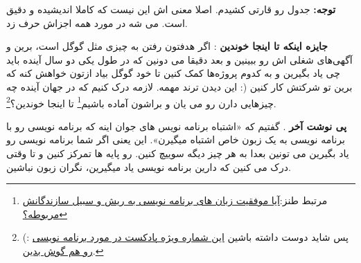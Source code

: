 \textbf{توجه:}
جدول رو قارتی کشیدم. اصلا معنی اش این نیست که کاملا اندیشیده و دقیق است. می شه در مورد همه اجزاش حرف زد.

\textbf{جایزه اینکه تا اینجا خوندین}
: اگر هدفتون رفتن به چیزی مثل گوگل است، برین و آگهی‌های شغلی اش رو ببینین و بعد دقیقا می دونین که در طول یکی دو سال آینده باید چی یاد بگیرین و به کدوم پروژه‌ها کمک کنین تا خود گوگل بیاد ازتون خواهش کنه که برین تو شرکتش کار کنین (: این دیدن ترند مهمه. لازمه درک کنیم که در جهان آینده چه چیزهایی دارن رو می یان و براشون آماده باشیم\footnote{مرتبط طنز:\href{http://jadi.net/2008/05/\%D8\%A2\%DB\%8C\%D8\%A7-\%D9\%85\%D9\%88\%D9\%81\%D9\%82\%DB\%8C\%D8\%AA-\%D8\%B2\%D8\%A8\%D8\%A7\%D9\%86\%E2\%80\%8C\%D9\%87\%D8\%A7\%DB\%8C-\%D8\%A8\%D8\%B1\%D9\%86\%D8\%A7\%D9\%85\%D9\%87\%E2\%80\%8C\%D9\%86\%D9\%88\%DB\%8C\%D8\%B3\%DB\%8C-\%D8\%A8\%D8\%A7/}{آیا موفقیت زبان های برنامه نویسی به ریش و سبیل سازندگانش مربوطه؟}}
تا اینجا خوندین؟\footnote{ (: پس شاید دوست داشته باشین
\href{http://jadi.net/2008/09/chegoone-barname-nevis-besham/" title="پادکست اول: چگونه می‌توانیم یک برنامه‌نویس خوب بشویم؟}{این شماره ویژه پادکست در مورد برنامه نویسی رو هم گوش بدین}.}.

\textbf{پی نوشت آخر}
. گفتیم که «اشتباه برنامه نویس های جوان اینه که برنامه نویسی رو با برنامه نویسی به یک زبون خاص اشتباه میگیرن». این یعنی اگر شما برنامه نویسی رو یاد بگیرین می تونین بعدا به هر چیز دیگه سوییچ کنین. رو پایه ها تمرکز کنین و تا وقتی درک می کنین که دارین برنامه نویسی یاد میگیرین، نگران زبون نباشین.

